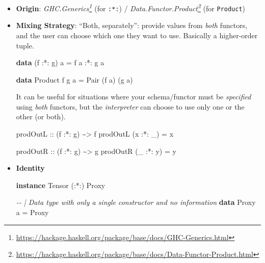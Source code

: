\documentclass[]{article}
\newenvironment{Shaded}{}{}
\newcommand{\CommentTok}[1]{\textcolor[rgb]{0.38,0.63,0.69}{\textit{#1}}}
\newcommand{\DataTypeTok}[1]{\textcolor[rgb]{0.56,0.13,0.00}{#1}}
\newcommand{\KeywordTok}[1]{\textcolor[rgb]{0.00,0.44,0.13}{\textbf{#1}}}
\newcommand{\NormalTok}[1]{#1}
\newcommand{\OperatorTok}[1]{\textcolor[rgb]{0.40,0.40,0.40}{#1}}
\newcommand{\OtherTok}[1]{\textcolor[rgb]{0.00,0.44,0.13}{#1}}
\renewcommand{\href}[2]{#2\footnote{\url{#1}}}
\begin{document}
\begin{itemize}
\item
  \textbf{Origin}:
  \emph{\href{https://hackage.haskell.org/package/base/docs/GHC-Generics.html}{GHC.Generics}}
  (for \texttt{:*:}) /
  \emph{\href{https://hackage.haskell.org/package/base/docs/Data-Functor-Product.html}{Data.Functor.Product}}
  (for \texttt{Product})
\item
  \textbf{Mixing Strategy}: ``Both, separately'': provide values from
  \emph{both} functors, and the user can choose which one they want to use.
  Basically a higher-order tuple.

\begin{Shaded}
\begin{Highlighting}[]
\KeywordTok{data}\NormalTok{ (f }\OperatorTok{:*:}\NormalTok{ g) a }\OtherTok{=}\NormalTok{ f a }\OperatorTok{:*:}\NormalTok{ g a}

\KeywordTok{data} \DataTypeTok{Product}\NormalTok{ f g a }\OtherTok{=} \DataTypeTok{Pair}\NormalTok{ (f a) (g a)}
\end{Highlighting}
\end{Shaded}

  It can be useful for situations where your schema/functor must be
  \emph{specified} using \emph{both} functors, but the \emph{interpreter} can
  choose to use only one or the other (or both).

\begin{Shaded}
\begin{Highlighting}[]
\OtherTok{prodOutL ::}\NormalTok{ (f }\OperatorTok{:*:}\NormalTok{ g) }\OperatorTok{\textasciitilde{}\textgreater{}}\NormalTok{ f}
\NormalTok{prodOutL (x }\OperatorTok{:*:}\NormalTok{ \_) }\OtherTok{=}\NormalTok{ x}

\OtherTok{prodOutR ::}\NormalTok{ (f }\OperatorTok{:*:}\NormalTok{ g) }\OperatorTok{\textasciitilde{}\textgreater{}}\NormalTok{ g}
\NormalTok{prodOutR (\_ }\OperatorTok{:*:}\NormalTok{ y) }\OtherTok{=}\NormalTok{ y}
\end{Highlighting}
\end{Shaded}
\item
  \textbf{Identity}

\begin{Shaded}
\begin{Highlighting}[]
\KeywordTok{instance} \DataTypeTok{Tensor}\NormalTok{ (}\OperatorTok{:*:}\NormalTok{) }\DataTypeTok{Proxy}

\CommentTok{{-}{-} | Data type with only a single constructor and no information}
\KeywordTok{data} \DataTypeTok{Proxy}\NormalTok{ a }\OtherTok{=} \DataTypeTok{Proxy}
\end{Highlighting}
\end{Shaded}


\end{itemize}
\end{document}
